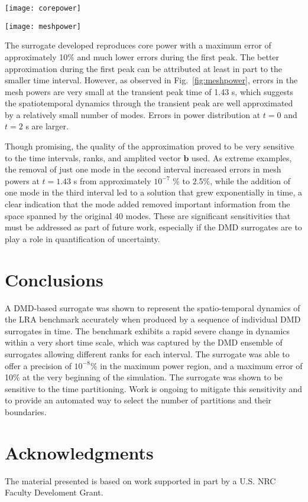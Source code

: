 \documentclass{anstrans}
\begin{document}
\begin{figure*}[t!]
 \centering
 \texttt{[image: corepower]}\\
   \caption{Left and center: reference and approximate core power density; right: corresponding absolute, relative error.}
  \label{fig:corepower}
\end{figure*}

\begin{figure*}[t!]
 \centering
 \texttt{[image: meshpower]}\\
   \caption{Left and center: reference and approximate mesh-wise powers (W); right: corresponding absolute, relative error.}
  \label{fig:meshpower}
\end{figure*}

The surrogate developed reproduces core power with a maximum error of approximately 10\% and much lower errors during the first peak.  The better approximation during the first peak can be attributed at least in part to the smaller time interval.  However, as observed in Fig.~\ref{fig:meshpower}, errors in the mesh powers are very small at the transient peak time of 1.43 s, which suggests the spatiotemporal dynamics through the transient peak are well approximated by a relatively small number of modes.  Errors in power distribution at $t = 0$ and $t = 2$ s are larger.


Though promising, the quality of the approximation proved to be very sensitive to the time intervals, ranks, and amplited vector $\mathbf{b}$ used.  As extreme examples, the removal of just one mode in the second interval increased errors in mesh powers at $t = 1.43$ s from approximately $10^{-7}$ \% to 2.5\%, while the addition of one mode in the third interval led to a solution that grew exponentially in time, a clear indication that the mode added removed important information from the space spanned by the original 40 modes.  These are  significant sensitivities that must be addressed as part of future work, especially if the DMD surrogates are to play a role in quantification of uncertainty.


\section{Conclusions}

A DMD-based surrogate was shown to represent the spatio-temporal dynamics of the LRA benchmark accurately when produced by a sequence of individual DMD surrogates in time. The benchmark exhibits a rapid severe change in dynamics within a very short time scale, which was captured by the DMD ensemble of surrogates allowing different ranks for each interval. The surrogate was able to offer a precision of $10^{-8}\%$ in the maximum power region, and a maximum error of 10\% at the very beginning of the simulation. The surrogate was shown to be sensitive to the time partitioning. Work is ongoing to mitigate this sensitivity and to provide an automated way to select the number of partitions and their boundaries.
\section{Acknowledgments}

The material presented is based on work supported in part by a U.S. NRC Faculty Develoment Grant. 



\end{document}
